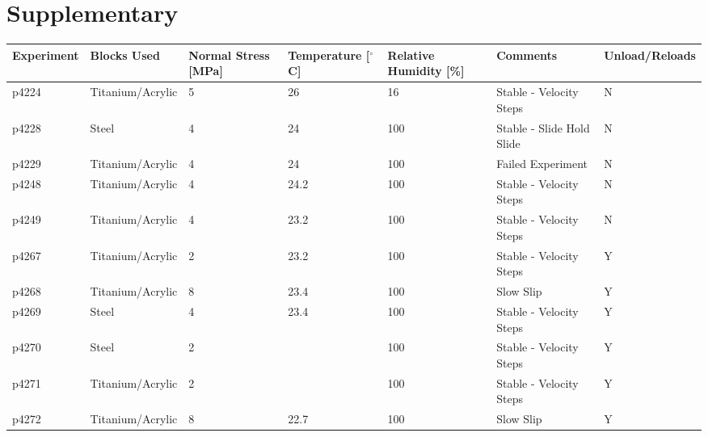 \documentclass[11pt]{article}
\begin{document}
\newpage
\section{Supplementary}

\small
\begin{center}
    \begin{tabular}{ | l l p{1.6cm} p{1.7cm} p{1.6cm} p{4cm} p{0.5cm} | }
\hline
Experiment & Blocks Used & Normal Stress [MPa] & Temperature [$^\circ$C] & Relative Humidity [\%] & Comments & Unload/Reloads \\
\hline
p4224      & Titanium/Acrylic & 5                   & 26              & 16                    & Stable - Velocity Steps         & N              \\
p4228      & Steel            & 4                   & 24              & 100                   & Stable - Slide Hold Slide       & N              \\
p4229      & Titanium/Acrylic & 4                   & 24              & 100                   & Failed Experiment               & N              \\
p4248      & Titanium/Acrylic & 4                   & 24.2            & 100                   & Stable - Velocity Steps         & N              \\
p4249      & Titanium/Acrylic & 4                   & 23.2            & 100                   & Stable - Velocity Steps         & N              \\
p4267      & Titanium/Acrylic & 2                   & 23.2            & 100                   & Stable - Velocity Steps         & Y              \\
p4268      & Titanium/Acrylic & 8                   & 23.4            & 100                   & Slow Slip                       & Y              \\
p4269      & Steel            & 4                   & 23.4            & 100                   & Stable - Velocity Steps         & Y              \\
p4270      & Steel            & 2                   &                 & 100                   & Stable - Velocity Steps         & Y              \\
p4271      & Titanium/Acrylic & 2                   &                 & 100                   & Stable - Velocity Steps         & Y              \\
p4272      & Titanium/Acrylic & 8                   & 22.7            & 100                   & Slow Slip                       & Y              \\

\end{tabular}
\end{center}
\end{document}
